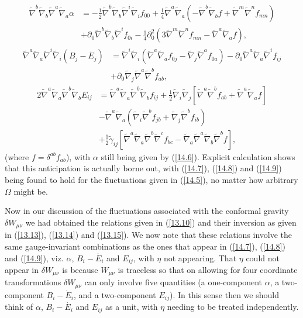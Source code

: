 %
\begin{align}
\tilde{\nabla}^b\tilde{\nabla}_b\tilde{\nabla}^a\tilde{\nabla}_a\alpha&=-\frac{1}{2}\tilde{\nabla}^b\tilde{\nabla}_b\tilde{\nabla}^i\tilde{\nabla}_if_{00}
+\frac{1}{4}\tilde{\nabla}^a\tilde{\nabla}_a\left(-\tilde{\nabla}^b\tilde{\nabla}_bf+\tilde{\nabla}^m\tilde{\nabla}^nf_{mn}\right)
\nonumber\\
&
+\partial_0\tilde{\nabla}^b\tilde{\nabla}_b\tilde{\nabla}^if_{0i}
-\frac{1}{4}\partial^2_0\left(3\tilde{\nabla}^m\tilde{\nabla}^nf_{mn}-\tilde{\nabla}^a\tilde{\nabla}_af\right),
\label{14.7}
\end{align}
%
%
\begin{align}
\tilde{\nabla}^a\tilde{\nabla}_a\tilde{\nabla}^i\tilde{\nabla}_i(B_j-\dot{E_j})&=\tilde{\nabla}^i\tilde{\nabla}_i (\tilde{\nabla}^a\tilde{\nabla}_af_{0j}-\tilde{\nabla}_j\tilde{\nabla}^af_{0a})
-\partial_0\tilde{\nabla}^a\tilde{\nabla}_a\tilde{\nabla}^if_{ij}
\nonumber\\
&
+\partial_0\tilde{\nabla}_j\tilde{\nabla}^a\tilde{\nabla}^bf_{ab},
\label{14.8}
\end{align}
%
%
\begin{align}
2\tilde{\nabla}^a\tilde{\nabla}_a\tilde{\nabla}^b\tilde{\nabla}_bE_{ij}
&=\tilde{\nabla}^a\tilde{\nabla}_a\tilde{\nabla}^b\tilde{\nabla}_bf_{ij}
+\tfrac{1}{2}\tilde{\nabla}_i\tilde{\nabla}_j\left[\tilde{\nabla}^a\tilde{\nabla}^bf_{ab}+\tilde{\nabla}^a\tilde{\nabla}_af\right]
\nonumber\\
&-\tilde{\nabla}^a\tilde{\nabla}_a(\tilde{\nabla}_i\tilde{\nabla}^bf_{jb}+\tilde{\nabla}_j\tilde{\nabla}^bf_{ib})
\nonumber\\
&
+\tfrac{1}{2}\tilde{\gamma}_{ij}\left[\tilde{\nabla}^a\tilde{\nabla}_a\tilde{\nabla}^b\tilde{\nabla}^cf_{bc}
-\tilde{\nabla}_a\tilde{\nabla}^a\tilde{\nabla}_b\tilde{\nabla}^bf\right],
\label{14.9}
\end{align}
%
(where $f=\delta^{ab}f_{ab}$), with $\alpha$ still being given by (\ref{14.6}). Explicit calculation shows that this anticipation is actually borne out, with (\ref{14.7}), (\ref{14.8}) and (\ref{14.9}) being found to hold for the fluctuations given in (\ref{14.5}), no matter how arbitrary $\Omega$ might be. 

Now in our discussion of the fluctuations associated with the conformal gravity $\delta W_{\mu\nu}$ we had obtained the relations given in (\ref{13.10}) and their inversion as given in (\ref{13.13}), (\ref{13.14}) and (\ref{13.15}). We now note that these relations involve the same gauge-invariant combinations as the ones that appear in (\ref{14.7}), (\ref{14.8}) and (\ref{14.9}), viz. $\alpha$, $B_i-\dot{E_i}$ and $E_{ij}$, with $\eta$ not appearing. That $\eta$ could not appear in $\delta W_{\mu\nu}$ is because $W_{\mu\nu}$ is traceless so that on allowing for four coordinate transformations $\delta W_{\mu\nu}$ can only involve five quantities (a one-component $\alpha$, a two-component $B_i-\dot{E}_i$, and a two-component $E_{ij}$). In this sense then we should think of $\alpha$, $B_i-\dot{E_i}$ and $E_{ij}$ as a unit, with $\eta$ needing to be treated independently.

